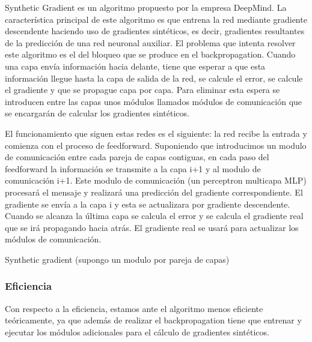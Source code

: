 Synthetic Gradient es un algoritmo propuesto por la empresa DeepMind. La característica principal de este algoritmo es que entrena la red mediante gradiente descendente haciendo uso de gradientes sintéticos, es decir, gradientes resultantes de la predicción de una red neuronal auxiliar. El problema que intenta resolver este algoritmo es el del bloqueo que se produce en el backpropagation. Cuando una capa envía información hacia delante, tiene que esperar a que esta información llegue hasta la capa de salida de la red, se calcule el error, se calcule el gradiente y que se propague capa por capa. Para eliminar esta espera se introducen entre las capas unos módulos llamados módulos de comunicación que se encargarán de calcular los gradientes sintéticos. 

El funcionamiento que siguen estas redes es el siguiente: la red recibe la entrada y comienza con el proceso de feedforward. Suponiendo que introducimos un modulo de comunicación entre cada pareja de capas contiguas, en cada paso del feedforward la información se transmite a la capa i+1 y al modulo de comunicación i+1. Este modulo de comunicación (un perceptron multicapa MLP) procesará el mensaje y realizará una predicción del gradiente correspondiente. El gradiente se envía a la capa i y esta se actualizara por gradiente descendente. Cuando se alcanza la última capa se calcula el error y se calcula el gradiente real que se irá propagando hacia atrás. El gradiente real se usará para actualizar los módulos de comunicación.

\begin{algorithm}[H]
   \caption{Synthetic gradient (supongo un modulo por pareja de capas)}
\end{algorithm}

\subsubsection{Eficiencia}
Con respecto a la eficiencia, estamos ante el algoritmo menos eficiente teóricamente, ya que además de realizar el backpropagation tiene que entrenar y ejecutar los módulos adicionales para el cálculo de gradientes sintéticos. 

